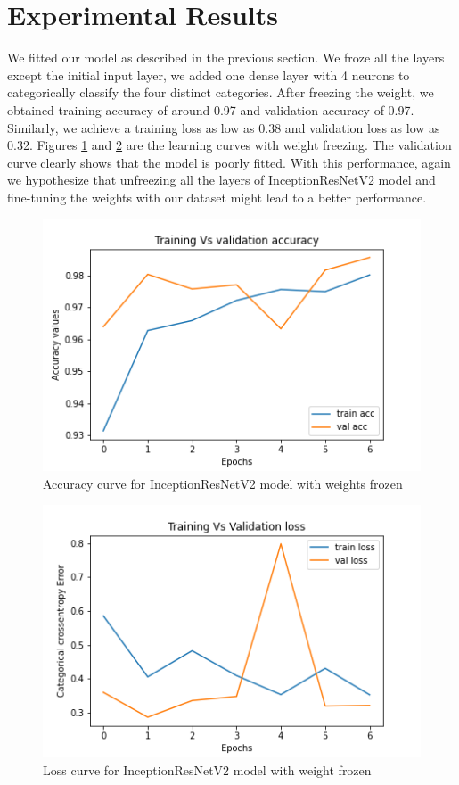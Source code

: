 \documentclass{report}
\begin{document}
\section{Experimental Results}
\label{sec:M4-results}
We fitted our model as described in the previous section. We froze all the layers except the initial input layer, we added one dense layer with 4 neurons to categorically classify the four distinct categories. After freezing the weight, we obtained training accuracy of around 0.97 and validation accuracy of 0.97. Similarly, we achieve a training loss as low as 0.38 and validation loss as low as 0.32. Figures \ref{fig:v2fr} and \ref{fig:lossV2} are the learning curves with weight freezing. The validation curve clearly shows that the model is poorly fitted. With this performance, again we hypothesize that unfreezing all the layers of InceptionResNetV2 model  and fine-tuning the weights with our dataset might lead to a better performance. 
\begin{figure}[H]
\centering
\includegraphics[width=\textwidth]{AccVal_FreezeInceptionResNetV2.png}
\caption{Accuracy curve for InceptionResNetV2 model with weights frozen}
\label{fig:v2fr}
\end{figure}
\begin{figure}[H]
\centering
\includegraphics[width=\textwidth]{LossVal_FreezeInceptionResNetV2.png}
\caption{Loss curve for InceptionResNetV2 model with weight frozen}
\label{fig:lossV2}
\end{figure}
\end{document}
